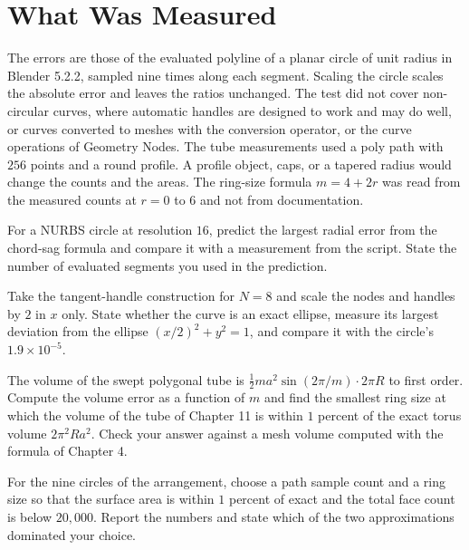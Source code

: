 \section{What Was Measured}

The errors are those of the evaluated polyline of a planar circle of unit radius in Blender 5.2.2, sampled nine times along each segment. Scaling the circle scales the absolute error and leaves the ratios unchanged. The test did not cover non-circular curves, where automatic handles are designed to work and may do well, or curves converted to meshes with the conversion operator, or the curve operations of Geometry Nodes. The tube measurements used a poly path with $256$ points and a round profile. A profile object, caps, or a tapered radius would change the counts and the areas. The ring-size formula $m=4+2r$ was read from the measured counts at $r=0$ to $6$ and not from documentation.

\begin{exercise}
For a NURBS circle at resolution $16$, predict the largest radial error from the chord-sag formula and compare it with a measurement from the script. State the number of evaluated segments you used in the prediction.
\end{exercise}

\begin{exercise}
Take the tangent-handle construction for $N=8$ and scale the nodes and handles by $2$ in $x$ only. State whether the curve is an exact ellipse, measure its largest deviation from the ellipse $(x/2)^2+y^2=1$, and compare it with the circle's $1.9\times10^{-5}$.
\end{exercise}

\begin{exercise}
The volume of the swept polygonal tube is $\tfrac12m a^2\sin(2\pi/m)\cdot2\pi R$ to first order. Compute the volume error as a function of $m$ and find the smallest ring size at which the volume of the tube of Chapter 11 is within $1$ percent of the exact torus volume $2\pi^2Ra^2$. Check your answer against a mesh volume computed with the formula of Chapter 4.
\end{exercise}

\begin{exercise}
For the nine circles of the arrangement, choose a path sample count and a ring size so that the surface area is within $1$ percent of exact and the total face count is below $20{,}000$. Report the numbers and state which of the two approximations dominated your choice.
\end{exercise}
